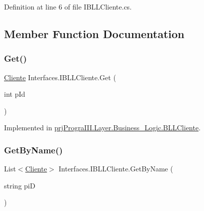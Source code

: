 Definition at line 6 of file I\+B\+L\+L\+Cliente.\+cs.



\subsection{Member Function Documentation}
\hypertarget{interface_interfaces_1_1_i_b_l_l_cliente_abebd310b8b290c0d3f35bfc4dc91c708}{}\label{interface_interfaces_1_1_i_b_l_l_cliente_abebd310b8b290c0d3f35bfc4dc91c708} 
\subsubsection{\texorpdfstring{Get()}{Get()}}
{\footnotesize\ttfamily \hyperlink{classprj_progra_i_i_i_1_1_layer_1_1_entities_1_1_cliente}{Cliente} Interfaces.\+I\+B\+L\+L\+Cliente.\+Get (\begin{DoxyParamCaption}\item[{int}]{p\+Id }\end{DoxyParamCaption})}



Implemented in \hyperlink{classprj_progra_i_i_i_1_1_layer_1_1_business___logic_1_1_b_l_l_cliente_abdfaa80f94058237b31fb8599bedd86c}{prj\+Progra\+I\+I\+I.\+Layer.\+Business\+\_\+\+Logic.\+B\+L\+L\+Cliente}.

\hypertarget{interface_interfaces_1_1_i_b_l_l_cliente_ad54e0142ff9bd0c63164a4bb102eb854}{}\label{interface_interfaces_1_1_i_b_l_l_cliente_ad54e0142ff9bd0c63164a4bb102eb854} 
\subsubsection{\texorpdfstring{Get\+By\+Name()}{GetByName()}}
{\footnotesize\ttfamily List$<$\hyperlink{classprj_progra_i_i_i_1_1_layer_1_1_entities_1_1_cliente}{Cliente}$>$ Interfaces.\+I\+B\+L\+L\+Cliente.\+Get\+By\+Name (\begin{DoxyParamCaption}\item[{string}]{piD }\end{DoxyParamCaption})}



